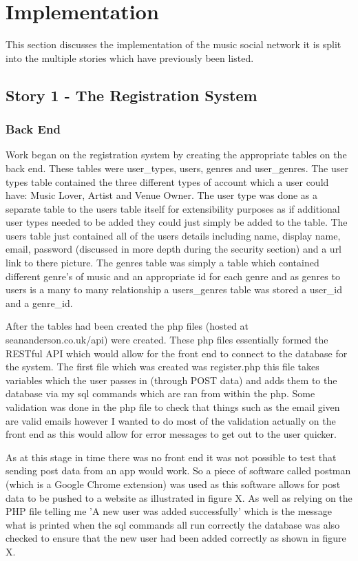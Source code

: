 \chapter{Implementation}
This section discusses the implementation of the music social network it is split into the multiple stories which have previously been listed.

\section{Story 1 - The Registration System}
\subsection{Back End}
Work began on the registration system by creating the appropriate tables on the back end. These tables were user\_types, users, genres and user\_genres. The user types table contained the three different types of account which a user could have: Music Lover, Artist and Venue Owner. The user type was done as a separate table to the users table itself for extensibility purposes as if additional user types needed to be added they could just simply be added to the table. The users table just contained all of the users details including name, display name, email, password (discussed in more depth during the security section) and a url link to there picture. The genres table was simply a table which contained different genre's of music and an appropriate id for each genre and as genres to users is a many to many relationship a users\_genres table was stored a user\_id and a genre\_id.

After the tables had been created the php files (hosted at seananderson.co.uk/api) were created. These php files essentially formed the RESTful API which would allow for the front end to connect to the database for the system. The first file which was created was register.php this file takes variables which the user passes in (through POST data) and adds them to the database via my sql commands which are ran from within the php. Some validation was done in the php file to check that things such as the email given are valid emails however I wanted to do most of the validation actually on the front end as this would allow for error messages to get out to the user quicker. 

As at this stage in time there was no front end it was not possible to test that sending post data from an app would work. So a piece of software called postman (which is a Google Chrome extension) was used as this software allows for post data to be pushed to a website as illustrated in figure X. As well as relying on the PHP file telling me 'A new user was added successfully' which is the message what is printed when the sql commands all run correctly the database was also checked to ensure that the new user had been added correctly as shown in figure X.

